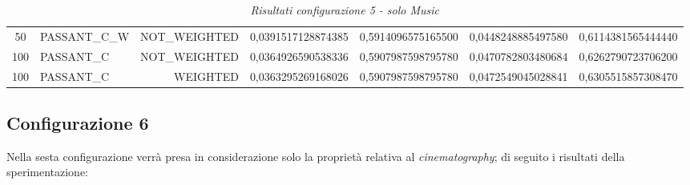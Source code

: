 \begin{table}[H]
{\begin{tabular}{ c l r c c c c }
				50 & PASSANT\_C\_W & NOT\_WEIGHTED & 0,0391517128874385 & 0,5914096575165500 & 0,0448248885497580 & 0,6114381565444440 \\
				
				100 &  PASSANT\_C & NOT\_WEIGHTED & 0,0364926590538336 & 0,5907987598795780 & 0,0470782803480684 & 0,6262790723706200 \\
				
				100 &  PASSANT\_C &   WEIGHTED & 0,0363295269168026 & 0,5907987598795780 & 0,0472549045028841 & 0,6305515857308470 \\
			\bottomrule
		\end{tabular}  
	}
	\caption{\emph{Risultati configurazione 5 - solo Music}}
\end{table}

\subsection{Configurazione 6}
Nella sesta configurazione verrà presa in considerazione solo la proprietà relativa al \emph{cinematography}; di seguito i risultati della sperimentazione:

